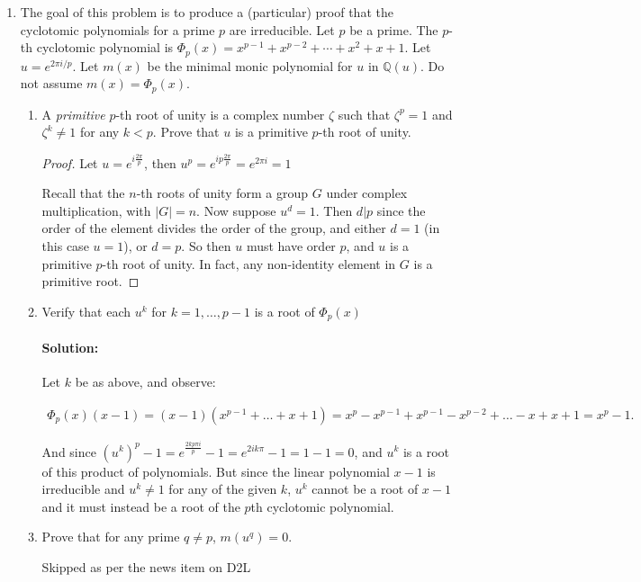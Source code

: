 \documentclass{article}
\begin{document}
    \begin{enumerate}
\item The goal of this problem is to produce a (particular) proof that the cyclotomic polynomials for a prime $p$ are irreducible.   Let $p$ be a prime.  The $p$-th cyclotomic polynomial is $\Phi_p(x)=x^{p-1}+x^{p-2}+\cdots +x^2+x+1$.  Let $u=e^{2\pi i/p}$.  Let $m(x)$ be the minimal monic polynomial for $u$ in ${\mathbb Q}(u)$.  Do not assume $m(x)=\Phi_p(x)$.

\begin{enumerate}
\item A {\it primitive} $p$-th root of unity is a complex number $\zeta$ such that $\zeta^p=1$ and $\zeta^k\neq 1$ for any $k<p$.  Prove that $u$ is a primitive $p$-th root of unity.
    \begin{proof} 
        Let $u=e^{i \frac{2\pi}{p}}$, then $u^{p}=e^{ip \frac{2\pi}{p}}=e^{2\pi i}=1$

        Recall that the $n$-th roots of unity form a group $G$ under complex multiplication, with $|G|=n$.
        Now suppose $u^{d}=1$. Then $d|p$ since the order of the element divides the order of the group,
        and either $d=1$ (in this case $u=1$), or $d=p$. So then $u$ must have order $p$, and $u$
        is a primitive $p$-th root of unity. In fact, any non-identity element in $G$ is a primitive root.
    \end{proof}
\item Verify that each $u^k$ for $k=1, \ldots , p-1$ is a root of $\Phi_p(x)$
    \paragraph{Solution:} Let $k$ be as above, and observe:

    \begin{align*}
        \Phi_p(x)(x-1)=(x-1)(x^{p-1}+\ldots+x+1)=x^{p}-x^{p-1}+x^{p-1}-x^{p-2}+\ldots-x+x+1=x^{p}-1
    .\end{align*}

    And since $(u^{k})^{p}-1=e^{\frac{2kp\pi i}{p}}-1=e^{2ik\pi}-1=1-1=0$, and $u^{k}$ is a root of this 
    product of polynomials. But since the linear polynomial $x-1$ is irreducible and $u^k\neq 1$ 
    for any of the given $k$, $u^{k}$ cannot be a root of $x-1$ and it must instead be a root of the 
    $p$th cyclotomic polynomial.

\item Prove that for any prime $q\neq p$, $m(u^q)=0$.

         Skipped as per the news item on D2L


\end{enumerate}
\end{enumerate}
\end{document}
